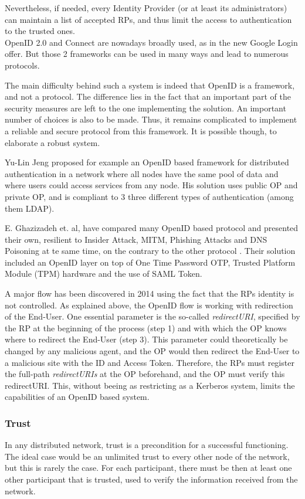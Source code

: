Nevertheless, if needed, every Identity Provider (or at least its administrators) can maintain a list of accepted RPs, and thus limit the access to authentication to the trusted ones.
\\

OpenID 2.0 and Connect are nowadays broadly used, as in the new Google Login offer. But those 2 frameworks can be used in many ways and lead to numerous protocols.

The main difficulty behind such a system is indeed that OpenID is a framework, and not a protocol. The difference lies in the fact that an important part of the security measures are left to the one implementing the solution. An important number of choices is also to be made. Thus, it remains complicated to implement a reliable and secure protocol from this framework. It is possible though, to elaborate a robust system. 

Yu-Lin Jeng proposed for example an OpenID based framework for distributed authentication in a network where all nodes have the same pool of data and where users could access services from any node. His solution uses public OP and private OP, and is compliant to 3 three different types of authentication (among them LDAP)\cite{Jeng2012}.

E. Ghazizadeh et. al, have compared many OpenID based protocol and presented their own, resilient to Insider Attack, MITM, Phishing Attacks and DNS Poisoning at te same time, on the contrary to the other protocol \cite{Ghazizadeh}. Their solution included an OpenID layer on top of One Time Password OTP, Trusted Platform Module (TPM) hardware and the use of  SAML Token.

A major flow has been discovered in 2014 using the fact that the RPs identity is not controlled. As explained above, the OpenID flow is working with redirection of the End-User. One essential parameter is the so-called \textit{redirectURI}, specified by the RP at the beginning of the process (step 1) and with which the OP knows where to redirect the End-User (step 3). This parameter could theoretically be changed by any malicious agent, and the OP would then redirect the End-User to a malicious site with the ID and Access Token. Therefore, the RPs must register the full-path \textit{redirectURIs} at the OP beforehand, and the OP must verify this redirectURI. This, without beeing as restricting as a Kerberos system, limits the capabilities of an OpenID based system.

\subsubsection{Trust}
In any distributed network, trust is a precondition for a successful functioning. The ideal case would be an unlimited trust to every other node of the network, but this is rarely the case. For each participant, there must be then at least one other participant that is trusted, used to verify the information received from the network.

